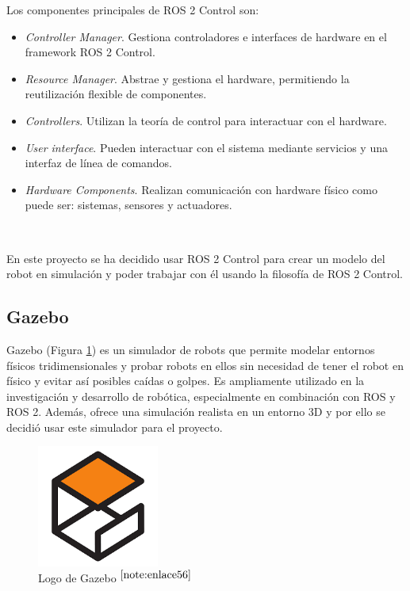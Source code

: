 Los componentes principales de \acs{ROS} 2 Control son:

\begin{itemize}
	\item\textit{Controller Manager}. Gestiona controladores e interfaces de hardware en el framework \acs{ROS} 2 Control.
	\item \textit{Resource Manager}. Abstrae y gestiona el hardware, permitiendo la reutilización flexible de componentes.
	\item \textit{Controllers}. Utilizan la teoría de control para interactuar con el hardware.
	\item \textit{User interface}. Pueden interactuar con el sistema mediante servicios y una interfaz de línea de comandos.
	\item \textit{Hardware Components}. Realizan comunicación con hardware físico como puede ser: sistemas, sensores y actuadores.
\end{itemize}\

En este proyecto se ha decidido usar \acs{ROS} 2 Control para crear un modelo del robot en simulación y poder trabajar con él usando la filosofía de \acs{ROS} 2 Control.


\subsection{Gazebo}

Gazebo (Figura \ref{fig:gazebo}) es un simulador de robots que permite modelar entornos físicos tridimensionales y probar robots en ellos sin necesidad de tener el robot en físico y evitar así posibles caídas o golpes. Es ampliamente utilizado en la investigación y desarrollo de robótica, especialmente en combinación con \acs{ROS} y \acs{ROS} 2. Además, ofrece una simulación realista en un entorno 3D y por ello se decidió usar este simulador para el proyecto.

\begin{figure} [h!]
	\begin{center}
		\includegraphics[width=4cm]{figs/gazebo.png}
	\end{center}
	\caption{Logo de Gazebo $^{\ref{note:enlace56}}$} 
	\label{fig:gazebo}
\end{figure}\

